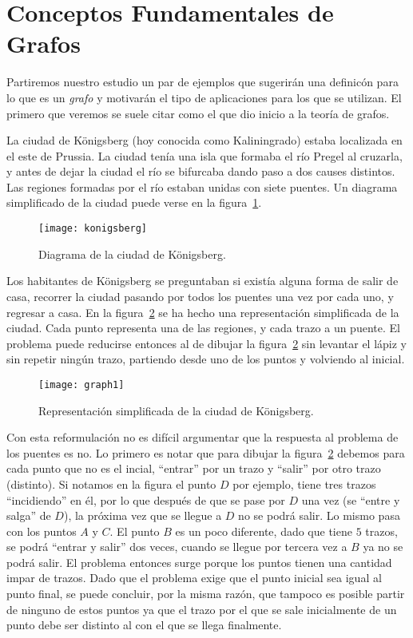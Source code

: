 \section{Conceptos Fundamentales de Grafos}

Partiremos nuestro estudio un par de ejemplos que sugerirán una definicón para lo que es un \emph{grafo} y motivarán el tipo de aplicaciones para los que se utilizan.
El primero que veremos se suele citar como el que dio inicio a la teoría de grafos.

\begin{ejemplo}
La ciudad de K\"onigsberg (hoy conocida como Kaliningrado) estaba localizada en el este de Prussia.
La ciudad tenía una isla que formaba el río Pregel al cruzarla, y antes de dejar la ciudad el río se bifurcaba dando paso a dos causes distintos.
Las regiones formadas por el río estaban unidas con siete puentes.
Un diagrama simplificado de la ciudad puede verse en la figura~\ref{fig:konigsberg}.

\begin{figure}[h!]
\centering
\texttt{[image: konigsberg]}
\caption{Diagrama de la ciudad de K\"onigsberg.}
\label{fig:konigsberg}
\end{figure}

Los habitantes de K\"onigsberg se preguntaban si existía alguna forma de salir de casa, recorrer la ciudad pasando por todos los puentes una vez por cada uno, y regresar a casa.
En la figura~\ref{fig:graph1} se ha hecho una representación simplificada de la ciudad.
Cada punto representa una de las regiones, y cada trazo a un puente.
El problema puede reducirse entonces al de dibujar la figura~\ref{fig:graph1} sin levantar el lápiz y sin repetir ningún trazo, partiendo desde uno de los puntos y volviendo al inicial.

\begin{figure}[h!]
\centering
\texttt{[image: graph1]}
\caption{Representación simplificada de la ciudad de K\"onigsberg.}
\label{fig:graph1}
\end{figure}

Con esta reformulación no es difícil argumentar que la respuesta al problema de los puentes es no.
Lo primero es notar que para dibujar la figura~\ref{fig:graph1} debemos para cada punto que no es el incial, ``entrar'' por un trazo y ``salir'' por otro trazo (distinto).
Si notamos en la figura el punto $D$ por ejemplo, tiene tres trazos ``incidiendo'' en él, por lo que después de que se pase por $D$ una vez (se ``entre y salga'' de $D$), la próxima vez que se llegue a $D$ no se podrá salir.
Lo mismo pasa con los puntos $A$ y $C$.
El punto $B$ es un poco diferente, dado que tiene $5$ trazos, se podrá ``entrar y salir'' dos veces, cuando se llegue por tercera vez a $B$ ya no se podrá salir.
El problema entonces surge porque los puntos tienen una cantidad impar de trazos.
Dado que el problema exige que el punto inicial sea igual al punto final, se puede concluir, por la misma razón, que tampoco es posible partir de ninguno de estos puntos ya que el trazo por el que se sale inicialmente de un punto debe ser distinto al con el que se llega finalmente.


\end{ejemplo}
